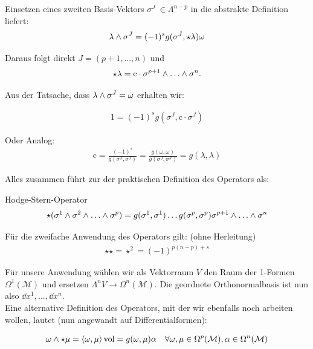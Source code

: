 Einsetzen eines zweiten Basis-Vektors $\sigma^J \ \in \Lambda^{n-p}$ in die abstrakte Definition liefert:
\begin{align}
\lambda \wedge \sigma^J = (-1)^s g(\sigma^J,\star \lambda)\omega
\end{align}

Daraus folgt direkt $J = (p+1, ..., n)$ und 
\begin{align}
\star\lambda = \text{c} \cdot \sigma^{p+1} \w \dots \w \sigma^n.
\end{align}

Aus der Tatsache, dass $\lambda \wedge \sigma^J = \omega$ erhalten wir:

\begin{align}
1 = (-1)^s g(\sigma^J,\text{c}\cdot\sigma^J)
\end{align}

Oder Analog:
\begin{align}
\text{c}= \frac{(-1)^s}{g(\sigma^J,\sigma^J)} = \frac{g(\omega,\omega)}{g(\sigma^J,\sigma^J)} = g(\lambda,\lambda)
\end{align}

Alles zusammen führt zur der praktischen Definition des Operators als:
\begin{mybox}{Hodge-Stern-Operator}
\begin{align}
\star(\sigma^1 \w \sigma^2 \w \dots \w \sigma^p) = g(\sigma^1,\sigma^1)\dots g(\sigma^p,\sigma^p) \sigma^{p+1}\w \dots \w \sigma^n
\end{align}
\end{mybox}


 Für die zweifache Anwendung des Operators gilt: (ohne Herleitung)
 \begin{align}
 \star \star = \star^2 = (-1)^{p(n-p)+s}
 \end{align}


Für unsere Anwendung wählen wir als Vektorraum $V$ den Raum der 1-Formen $\Omega^1(\mathcal{M})$ und ersetzen $\Lambda^n V \rightarrow \Omega^n(\mathcal{M})$. Die geordnete Orthonormalbasis ist nun also ${\dd x^1, ..., \dd x^n}$. \\



Eine alternative Definition des Operators, mit der wir ebenfalls noch arbeiten wollen, lautet (nun angewandt auf Differentialformen):

\begin{align}
\omega \wedge \star \mu = \left<\omega,\mu \right>\text{vol} = g(\omega,\mu)\alpha \quad \forall \omega, \mu \in \Omega^p(\mathcal{M}), \alpha \in \Omega^n(\mathcal{M})
\end{align}

